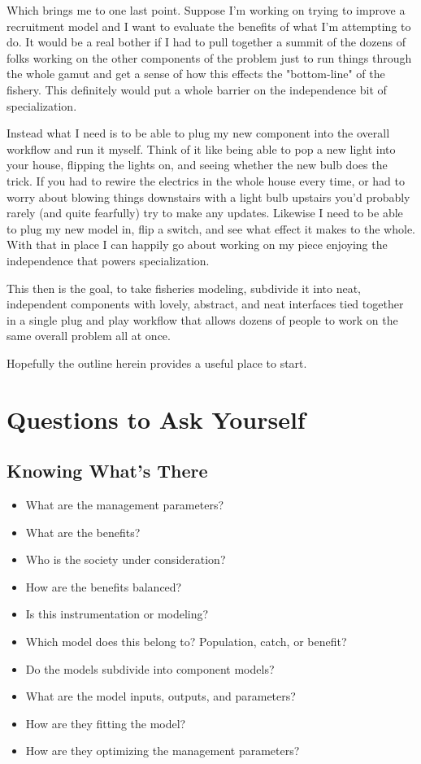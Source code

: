 \documentclass[11pt,a5paper]{book}
\begin{document}
Which brings me to one last point. Suppose I'm working on trying to improve a recruitment model and I want to evaluate the benefits of what I'm attempting to do. It would be a real bother if I had to pull together a summit of the dozens of folks working on the other components of the problem just to run things through the whole gamut and get a sense of how this effects the "bottom-line" of the fishery. This definitely would put a whole barrier on the independence bit of specialization.
\newline

Instead what I need is to be able to plug my new component into the overall workflow and run it myself. Think of it like being able to pop a new light into your house, flipping the lights on, and seeing whether the new bulb does the trick. If you had to rewire the electrics in the whole house every time, or had to worry about blowing things downstairs with a light bulb upstairs you'd probably rarely (and quite fearfully) try to make any updates. Likewise I need to be able to plug my new model in, flip a switch, and see what effect it makes to the whole. With that in place I can happily go about working on my piece enjoying the independence that powers specialization.
\newline

This then is the goal, to take fisheries modeling, subdivide it into neat, independent components with lovely, abstract, and neat interfaces tied together in a single plug and play workflow that allows dozens of people to work on the same overall problem all at once. 
\newline

Hopefully the outline herein provides a useful place to start. 

\chapter{Questions to Ask Yourself}

\section{Knowing What's There}

\begin{itemize}
\item What are the management parameters?
\item What are the benefits?
\item Who is the society under consideration?
\item How are the benefits balanced?
\item Is this instrumentation or modeling?
\item Which model does this belong to? Population, catch, or benefit?
\item Do the models subdivide into component models? 
\item What are the model inputs, outputs, and parameters?
\item How are they fitting the model?
\item How are they optimizing the management parameters?
\end{itemize}
\end{document}
